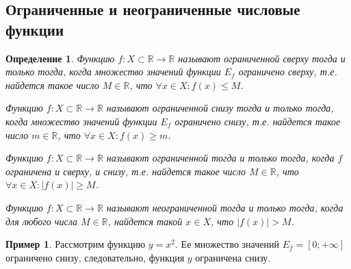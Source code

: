 \documentclass[a4paper,12pt]{article} %
\newtheorem{definition}{Определение}[section]
\theoremstyle{remark}
\theoremstyle{definition}
\newtheorem{exmp}{Пример}[section]
\begin{document}
\subsection{Ограниченные и неограниченные числовые функции}
\begin{definition}
    Функцию $f : X\subset \mathbb{R} \to \mathbb{R}$ называют ограниченной сверху тогда и только тогда, когда
    множество значений функции $E_f$ ограничено сверху, т.е. найдется такое число $M \in \mathbb{R}$,
    что $\forall x \in X : f(x) \le M$.

    Функцию $f : X\subset \mathbb{R} \to \mathbb{R}$ называют ограниченной снизу тогда и только тогда, когда
    множество значений функции $E_f$ ограничено снизу, т.е. найдется такое число $m \in \mathbb{R}$,
    что $\forall x \in X : f(x) \ge m$.

    Функцию $f : X\subset \mathbb{R} \to \mathbb{R}$ называют ограниченной тогда и только тогда, когда
    $f$ ограничена и сверху, и снизу, т.е. найдется такое число $M \in \mathbb{R}$,
    что $\forall x \in X : |f(x)| \ge M$.

    Функцию $f : X\subset \mathbb{R} \to \mathbb{R}$ называют неограниченной тогда и только тогда, когда
    для любого числа $M \in \mathbb{R}$, найдется такой $x \in X$, что $|f(x)| > M$.
\end{definition}
\begin{exmp}
    Рассмотрим функцию $y = x^2$. Ее множество значений $E_f = [0; +\infty]$ ограничено снизу,
    следовательно, функция $y$ ограничена снизу.
\end{exmp}
\end{document}
